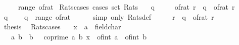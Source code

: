 \begin{isabellebody}
\ \ \ {\isachardoublequoteopen}{\isasymrat}\ {\isacharequal}{\kern0pt}\ range\ of{\isacharunderscore}{\kern0pt}rat{\isachardoublequoteclose}\isanewline
\isanewline
{}\isamarkupfalse%
\isanewline
\isanewline
{}\isamarkupfalse%
\ Rats{\isacharunderscore}{\kern0pt}cases\ {\isacharbrackleft}{\kern0pt}cases\ set{\isacharcolon}{\kern0pt}\ Rats{\isacharbrackright}{\kern0pt}{\isacharcolon}{\kern0pt}\isanewline
\ \ \ {\isachardoublequoteopen}q\ {\isasymin}\ {\isasymrat}{\isachardoublequoteclose}\isanewline
\ \ \ {\isacharparenleft}{\kern0pt}of{\isacharunderscore}{\kern0pt}rat{\isacharparenright}{\kern0pt}\ r\ \ {\isachardoublequoteopen}q\ {\isacharequal}{\kern0pt}\ of{\isacharunderscore}{\kern0pt}rat\ r{\isachardoublequoteclose}\isanewline
%
\isadelimproof
%
\endisadelimproof
%
\isatagproof
{}\isamarkupfalse%
\ {\isacharminus}{\kern0pt}\isanewline
\ \ \isamarkupfalse%
\ {\isacartoucheopen}q\ {\isasymin}\ {\isasymrat}{\isacartoucheclose}\ \isamarkupfalse%
\ {\isachardoublequoteopen}q\ {\isasymin}\ range\ of{\isacharunderscore}{\kern0pt}rat{\isachardoublequoteclose}\isanewline
\ \ \ \ \isamarkupfalse%
\ {\isacharparenleft}{\kern0pt}simp\ only{\isacharcolon}{\kern0pt}\ Rats{\isacharunderscore}{\kern0pt}def{\isacharparenright}{\kern0pt}\isanewline
\ \ \isamarkupfalse%
\ \isamarkupfalse%
\ r\ \ {\isachardoublequoteopen}q\ {\isacharequal}{\kern0pt}\ of{\isacharunderscore}{\kern0pt}rat\ r{\isachardoublequoteclose}\ \isacommand{{\isachardot}{\kern0pt}{\isachardot}{\kern0pt}}\isamarkupfalse%
\isanewline
\ \ \isamarkupfalse%
\ \isamarkupfalse%
\ thesis\ \isacommand{{\isachardot}{\kern0pt}{\isachardot}{\kern0pt}}\isamarkupfalse%
\isanewline
{}\isamarkupfalse%
%
\endisatagproof
{\isafoldproof}%
%
\isadelimproof
\isanewline
%
\endisadelimproof
\isanewline
{}\isamarkupfalse%
\ Rats{\isacharunderscore}{\kern0pt}cases{\isacharprime}{\kern0pt}{\isacharcolon}{\kern0pt}\isanewline
\ \ \ {\isachardoublequoteopen}{\isacharparenleft}{\kern0pt}x\ {\isacharcolon}{\kern0pt}{\isacharcolon}{\kern0pt}\ {\isacharprime}{\kern0pt}a\ {\isacharcolon}{\kern0pt}{\isacharcolon}{\kern0pt}\ field{\isacharunderscore}{\kern0pt}char{\isacharunderscore}{\kern0pt}{}{\isacharparenright}{\kern0pt}\ {\isasymin}\ {\isasymrat}{\isachardoublequoteclose}\isanewline
\ \ \ a\ b\ \ {\isachardoublequoteopen}b\ {\isachargreater}{\kern0pt}\ {}{\isachardoublequoteclose}\ {\isachardoublequoteopen}coprime\ a\ b{\isachardoublequoteclose}\ {\isachardoublequoteopen}x\ {\isacharequal}{\kern0pt}\ of{\isacharunderscore}{\kern0pt}int\ a\ {\isacharslash}{\kern0pt}\ of{\isacharunderscore}{\kern0pt}int\ b{\isachardoublequoteclose}\isanewline

\end{isabellebody}

